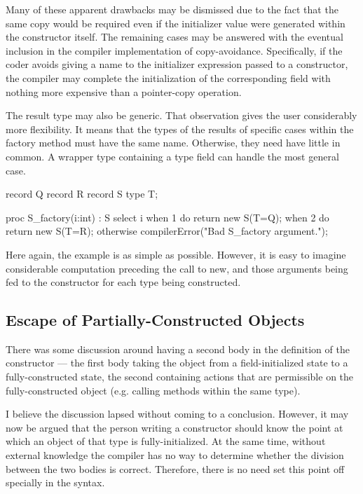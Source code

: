 Many of these apparent drawbacks may be dismissed due to the fact that the same copy would
be required even if the initializer value were generated within the constructor itself.
The remaining cases may be answered with the eventual inclusion in the compiler
implementation of copy-avoidance.  Specifically, if the coder avoids giving a name to the
initializer expression passed to a constructor, the compiler may complete the
initialization of the corresponding field with nothing more expensive than a pointer-copy
operation.

\vspace{6pt}

The result type may also be generic.  That observation gives the user considerably more
flexibility.  It means that the types of the results of specific cases within the factory
method must have the same name.  Otherwise, they need have little in common.  A wrapper
type containing a type field can handle the most general case.

\begin{chapel}
record Q { }
record R { }
record S { type T; }

proc S_factory(i:int) : S {
  select i {
    when 1 do return new S(T=Q);
    when 2 do return new S(T=R);
    otherwise compilerError("Bad S_factory argument.");
  }
}
\end{chapel}
\noindent
Here again, the example is as simple as possible.  However, it is easy to imagine
considerable computation preceding the call to new, and those arguments being fed to the
constructor for each type being constructed.

\subsection{Escape of Partially-Constructed Objects}

There was some discussion around having a second body in the definition of the constructor
--- the first body taking the object from a field-initialized state to a
fully-constructed state, the second containing actions that are permissible on the
fully-constructed object (e.g. calling methods within the same type).

I believe the discussion lapsed without coming to a conclusion.  However, it may now be
argued that the person writing a constructor should know the point at which an object of
that type is fully-initialized.  At the same time, without external knowledge the compiler has no way to determine
whether the division between the two bodies is correct.  Therefore, there is no need set this point off specially
in the syntax.  

